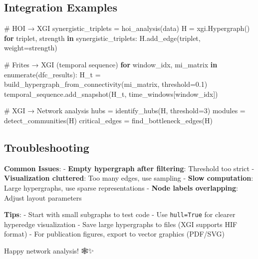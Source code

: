 \documentclass[
  11pt,
  letterpaper,
  oneside,
  openany]{book}
\newenvironment{Shaded}{\begin{snugshade}}{\end{snugshade}}
\newcommand{\BuiltInTok}[1]{\textcolor[rgb]{0.00,0.23,0.31}{#1}}
\newcommand{\CommentTok}[1]{\textcolor[rgb]{0.37,0.37,0.37}{#1}}
\newcommand{\ControlFlowTok}[1]{\textcolor[rgb]{0.00,0.23,0.31}{\textbf{#1}}}
\newcommand{\DecValTok}[1]{\textcolor[rgb]{0.68,0.00,0.00}{#1}}
\newcommand{\FloatTok}[1]{\textcolor[rgb]{0.68,0.00,0.00}{#1}}
\newcommand{\KeywordTok}[1]{\textcolor[rgb]{0.00,0.23,0.31}{\textbf{#1}}}
\newcommand{\NormalTok}[1]{\textcolor[rgb]{0.00,0.23,0.31}{#1}}
\newcommand{\OperatorTok}[1]{\textcolor[rgb]{0.37,0.37,0.37}{#1}}
\begin{document}
\subsection{Integration Examples}\label{integration-examples}

\begin{Shaded}
\begin{Highlighting}[]
\CommentTok{\# HOI → XGI}
\NormalTok{synergistic\_triplets }\OperatorTok{=}\NormalTok{ hoi\_analysis(data)}
\NormalTok{H }\OperatorTok{=}\NormalTok{ xgi.Hypergraph()}
\ControlFlowTok{for}\NormalTok{ triplet, strength }\KeywordTok{in}\NormalTok{ synergistic\_triplets:}
\NormalTok{    H.add\_edge(triplet, weight}\OperatorTok{=}\NormalTok{strength)}

\CommentTok{\# Frites → XGI (temporal sequence)}
\ControlFlowTok{for}\NormalTok{ window\_idx, mi\_matrix }\KeywordTok{in} \BuiltInTok{enumerate}\NormalTok{(dfc\_results):}
\NormalTok{    H\_t }\OperatorTok{=}\NormalTok{ build\_hypergraph\_from\_connectivity(mi\_matrix, threshold}\OperatorTok{=}\FloatTok{0.1}\NormalTok{)}
\NormalTok{    temporal\_sequence.add\_snapshot(H\_t, time\_windows[window\_idx])}

\CommentTok{\# XGI → Network analysis}
\NormalTok{hubs }\OperatorTok{=}\NormalTok{ identify\_hubs(H, threshold}\OperatorTok{=}\DecValTok{3}\NormalTok{)}
\NormalTok{modules }\OperatorTok{=}\NormalTok{ detect\_communities(H)}
\NormalTok{critical\_edges }\OperatorTok{=}\NormalTok{ find\_bottleneck\_edges(H)}
\end{Highlighting}
\end{Shaded}

\subsection{Troubleshooting}\label{troubleshooting-1}

\textbf{Common Issues}: - \textbf{Empty hypergraph after filtering}:
Threshold too strict - \textbf{Visualization cluttered}: Too many edges,
use sampling - \textbf{Slow computation}: Large hypergraphs, use sparse
representations - \textbf{Node labels overlapping}: Adjust layout
parameters

\textbf{Tips}: - Start with small subgraphs to test code - Use
\texttt{hull=True} for clearer hyperedge visualization - Save large
hypergraphs to files (XGI supports HIF format) - For publication
figures, export to vector graphics (PDF/SVG)

Happy network analysis! 🕸️✨
\end{document}

